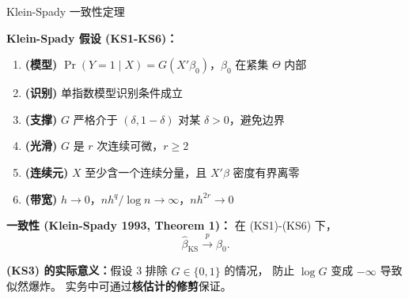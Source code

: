 \documentclass[aspectratio=169, 10pt]{beamer}
\begin{document}
\begin{frame}{Klein-Spady 一致性定理}

  \begin{assumptionbox}
  \textbf{Klein-Spady 假设 (KS1-KS6)：}
  \begin{enumerate}\setlength{\itemsep}{1pt}
    \item \textbf{(模型)} $\Pr(Y=1 \mid X) = G(X'\beta_0)$，$\beta_0$ 在紧集 $\Theta$ 内部
    \item \textbf{(识别)} 单指数模型识别条件成立
    \item \textbf{(支撑)} $G$ 严格介于 $(\delta, 1-\delta)$ 对某 $\delta > 0$，避免边界
    \item \textbf{(光滑)} $G$ 是 $r$ 次连续可微，$r \geq 2$
    \item \textbf{(连续元)} $X$ 至少含一个连续分量，且 $X'\beta$ 密度有界离零
    \item \textbf{(带宽)} $h \to 0$，$nh^q / \log n \to \infty$，$nh^{2r} \to 0$
  \end{enumerate}
  \end{assumptionbox}

  \begin{highlightbox}
    \textbf{一致性 (Klein-Spady 1993, Theorem 1)：}
    在 (KS1)-(KS6) 下，
    $$\hat\beta_{\text{KS}} \overset{p}{\to} \beta_0.$$
  \end{highlightbox}

  \begin{keybox}
    \textbf{(KS3) 的实际意义：}假设 3 排除 $G \in \{0, 1\}$ 的情况，
    防止 $\log \hat G$ 变成 $-\infty$ 导致似然爆炸。
    实务中可通过\textbf{核估计的修剪}保证。
  \end{keybox}

\end{frame}
\end{document}
